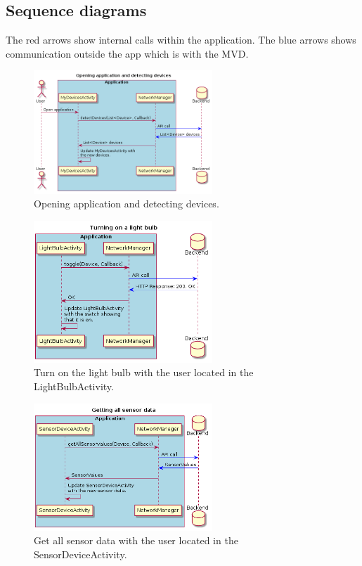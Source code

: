 \documentclass[a4paper]{article}
\begin{document}
	
	\subsection{Sequence diagrams}
	The red arrows show internal calls within the application. The blue arrows shows communication outside the app which is with the MVD.
	
	\begin{figure}[H]
    \centering
    \includegraphics[width=0.6\textwidth]{seq.png} 
    \caption{Opening application and detecting devices.}
    \label{fig:seq}
\end{figure}

\begin{figure}[H]
    \centering
    \includegraphics[width=0.6\textwidth]{seq1.png}
    \caption{Turn on the light bulb with the user located in the LightBulbActivity.}
    \label{fig:seq1}
\end{figure}

\begin{figure}[H]
    \centering
    \includegraphics[width=0.6\textwidth]{seq2.png}
    \caption{Get all sensor data with the user located in the SensorDeviceActivity.}
    \label{fig:seq2}
\end{figure}
\end{document}
